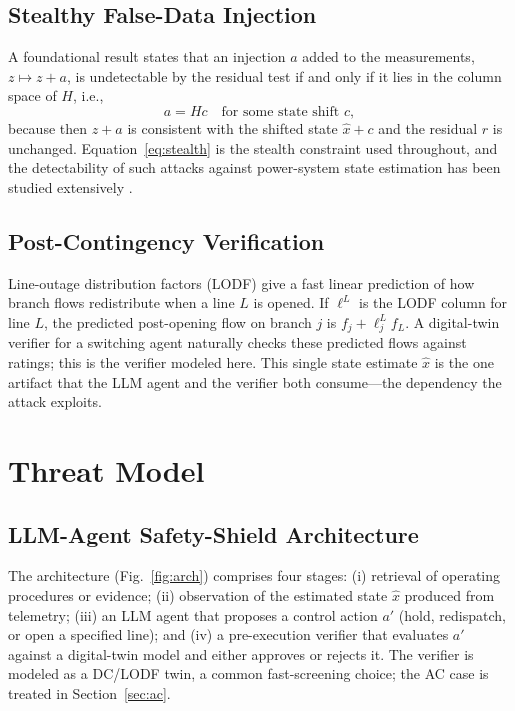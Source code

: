 \documentclass{ieeeaccess}
\begin{document}
\subsection{Stealthy False-Data Injection}
A foundational result \cite{liu} states that an injection $a$ added to the measurements, $z \mapsto z + a$, is undetectable by the residual test if and only if it lies in the column space of $H$, i.e.,
\begin{equation}
a = Hc \quad\text{for some state shift } c, \label{eq:stealth}
\end{equation}
because then $z+a$ is consistent with the shifted state $\hat{x}+c$ and the residual $r$ is unchanged. Equation~\eqref{eq:stealth} is the stealth constraint used throughout, and the detectability of such attacks against power-system state estimation has been studied extensively \cite{bobba,kosut,huggiampapa}.

\subsection{Post-Contingency Verification}
Line-outage distribution factors (LODF) \cite{wood} give a fast linear prediction of how branch flows redistribute when a line $L$ is opened. If $\ell^{L}$ is the LODF column for line $L$, the predicted post-opening flow on branch $j$ is $f_j + \ell^{L}_j f_L$. A digital-twin verifier for a switching agent naturally checks these predicted flows against ratings; this is the verifier modeled here. This single state estimate $\hat{x}$ is the one artifact that the LLM agent and the verifier both consume---the dependency the attack exploits.

\section{Threat Model}\label{sec:threat}
\subsection{LLM-Agent Safety-Shield Architecture}
The architecture (Fig.~\ref{fig:arch}) comprises four stages: (i) retrieval of operating procedures or evidence; (ii) observation of the estimated state $\hat{x}$ produced from telemetry; (iii) an LLM agent that proposes a control action $a'$ (hold, redispatch, or open a specified line); and (iv) a pre-execution verifier that evaluates $a'$ against a digital-twin model and either approves or rejects it. The verifier is modeled as a DC/LODF twin, a common fast-screening choice; the AC case is treated in Section~\ref{sec:ac}.
\end{document}
